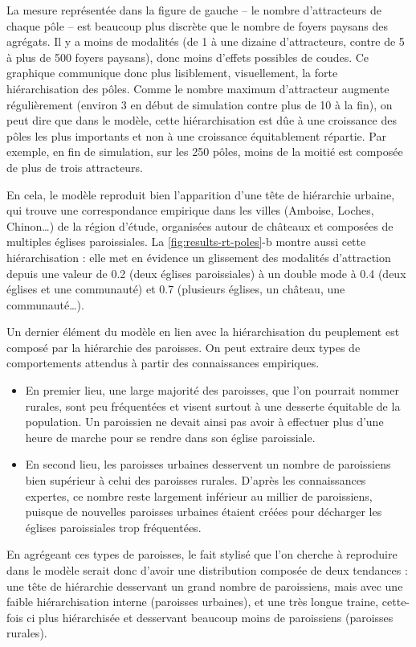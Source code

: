 La mesure représentée dans la figure de gauche -- le nombre d'attracteurs de chaque pôle -- est beaucoup plus \og discrète\fg{} que le nombre de foyers paysans des agrégats.
Il y a moins de modalités (de 1 à une dizaine d'attracteurs, contre de 5 à plus de 500 foyers paysans), donc moins d'effets possibles de coudes.
Ce graphique communique donc plus lisiblement, visuellement, la forte hiérarchisation des pôles.
Comme le nombre maximum d'attracteur augmente régulièrement (environ 3 en début de simulation contre plus de 10 à la fin), on peut dire que dans le modèle, cette hiérarchisation est dûe à une croissance des pôles les plus importants et non à une croissance équitablement répartie.
Par exemple, en fin de simulation, sur les 250 pôles, moins de la moitié est composée de plus de trois attracteurs.

En cela, le modèle reproduit bien l'apparition d'une tête de hiérarchie urbaine, qui trouve une correspondance empirique dans les villes (Amboise, Loches, Chinon\ldots) de la région d'étude, organisées autour de châteaux et composées de multiples églises paroissiales.
La \cref{fig:results-rt-poles}-b montre aussi cette hiérarchisation : elle met en évidence un glissement des modalités d'attraction depuis une valeur de 0.2 (deux églises paroissiales) à un double mode à 0.4 (deux églises et une communauté) et 0.7 (plusieurs églises, un château, une communauté\ldots).


Un dernier élément du modèle en lien avec la hiérarchisation du peuplement est composé par la hiérarchie des paroisses.
On peut extraire deux types de comportements attendus à partir des connaissances empiriques.
\begin{itemize}
	\item En premier lieu, une large majorité des paroisses, que l'on pourrait nommer \og rurales\fg{}, sont peu fréquentées et visent surtout à une desserte équitable de la population.
	Un paroissien ne devait ainsi pas avoir à effectuer plus d'une heure de marche pour se rendre dans son église paroissiale.
	\item En second lieu, les paroisses \og urbaines\fg{} desservent un nombre de paroissiens bien supérieur à celui des paroisses rurales.
	D'après les connaissances expertes, ce nombre reste largement inférieur au millier de paroissiens, puisque de nouvelles paroisses urbaines étaient créées pour décharger les églises paroissiales trop fréquentées.
\end{itemize}
En agrégeant ces types de paroisses, le fait stylisé que l'on cherche à reproduire dans le modèle serait donc d'avoir une distribution composée de deux tendances : une tête de hiérarchie desservant un grand nombre de paroissiens, mais avec une faible hiérarchisation interne (paroisses urbaines), et une très longue traine, cette-fois ci plus hiérarchisée et desservant beaucoup moins de paroissiens (paroisses rurales).


